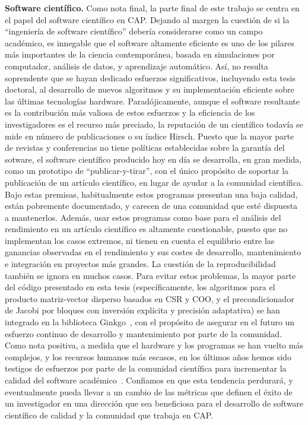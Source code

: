 \noindent\textbf{Software científico.}
Como nota final, la parte final de este trabajo se centra en el papel del
software científico en CAP.  Dejando al margen la cuestión de si la ``ingeniería
de software científico'' debería considerarse como un campo académico, es
innegable que el software altamente eficiente es uno de los pilares más
importantes de la ciencia contemporánea, basada en simulaciones por computador,
análisis de datos, y aprendizaje automático. Así, no resulta soprendente que se
hayan dedicado esfuerzos significativos, incluyendo esta tesis doctoral, al
desarrollo de nuevos algoritmos y su implementación eficiente sobre las últimas
tecnologías hardware.  Paradójicamente, aunque el software resultante es la
contribución más valiosa de estos esfuerzos y la eficiencia de los
investigadores es el recurso más preciado, la reputación de un científico
todavía se mide en número de publicaciones o su índice Hirsch.  Puesto que la
mayor parte de revistas y conferencias no tiene políticas establecidas sobre la
garantía del sotware, el software científico producido hoy en día se desarrolla,
en gran medida, como un prototipo de ``publicar-y-tirar'', con el único
propósito de soportar la publicación de un artículo científico, en lugar de
ayudar a la comunidad científica. Bajo estas premisas, habitualmente estos
programas presentan una baja calidad, están pobremente documentado, y carecen de
una comunidad que esté dispuesta a mantenerlos. Además, usar estos programas
como base para el análisis del rendimiento en un artículo científico es
altamente cuestionable, puesto que no implementan los casos extremos, ni tienen
en cuenta el equilibrio entre las ganancias observadas en el rendimiento y sus
costes de desarrollo, mantenimiento e integración en proyectos más grandes.  La
cuestión de la reproducibilidad también  se ignora en muchos casos. Para evitar
estos problemas, la mayor parte del código presentado en esta tesis
(específicamente, los algoritmos para el producto matriz-vector disperso basados
en CSR y COO, y el precondicionador de Jacobi por bloques con inversión
explícita y precisión adaptativa) se han integrado en la biblioteca
Ginkgo~\cite{ginkgo}, con el propósito de asegurar en el futuro un esfuerzo
continuo de desarrollo y mantenimiento por parte de la comunidad.  Como nota
positiva, a medida que el hardware y los programas se han vuelto más complejos,
y los recursos humanos más escasos, en los últimos años hemos sido testigos de
esfuerzos por parte de la comunidad científica para incrementar la calidad del
software académico~\cite{toms,xsdk,bssw,patch-contrib}.  Confiamos en que esta
tendencia perdurará, y eventualmente pueda llevar a un cambio de las métricas
que definen el éxito de un investigador en una dirección que sea beneficiosa
para el desarrollo de software científico de calidad y la comunidad que trabaja
en CAP.
